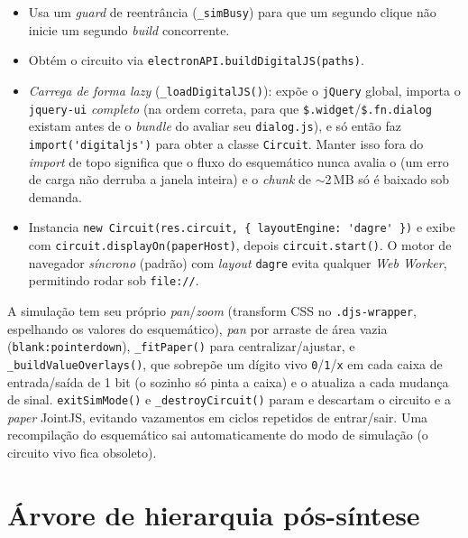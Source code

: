 \begin{itemize}[leftmargin=1.4em]
  \item Usa um \emph{guard} de reentrância (\lstinline|_simBusy|) para que um
        segundo clique não inicie um segundo \emph{build} concorrente.
  \item Obtém o circuito via \lstinline|electronAPI.buildDigitalJS(paths)|.
  \item \emph{Carrega  de forma \emph{lazy}}
        (\lstinline|_loadDigitalJS()|): expõe o \lstinline|jQuery| global,
        importa o \lstinline|jquery-ui| \emph{completo} (na ordem correta, para
        que \lstinline|$.widget|/\lstinline|$.fn.dialog| existam antes de o
        \emph{bundle} do  avaliar seu \lstinline|dialog.js|), e
        só então faz \lstinline|import('digitaljs')| para obter a classe
        \lstinline|Circuit|. Manter isso fora do \emph{import} de topo significa
        que o fluxo do esquemático nunca avalia o  (um erro de
        carga não derruba a janela inteira) e o \emph{chunk} de $\sim$2\,MB só é
        baixado sob demanda.
  \item Instancia \lstinline|new Circuit(res.circuit, { layoutEngine: 'dagre' })|
        e exibe com \lstinline|circuit.displayOn(paperHost)|, depois
        \lstinline|circuit.start()|. O motor de navegador \emph{síncrono} (padrão)
        com \emph{layout} \lstinline|dagre| evita qualquer \emph{Web Worker},
        permitindo rodar sob \lstinline|file://|.
\end{itemize}

A simulação tem seu próprio \emph{pan}/\emph{zoom} (transform CSS no
\lstinline|.djs-wrapper|, espelhando os valores do esquemático), \emph{pan} por
arraste de área vazia (\lstinline|blank:pointerdown|), \lstinline|_fitPaper()|
para centralizar/ajustar, e \lstinline|_buildValueOverlays()|, que sobrepõe um
dígito vivo \lstinline|0|/\lstinline|1|/\lstinline|x| em cada caixa de
entrada/saída de 1 bit (o  sozinho só pinta a caixa) e o atualiza
a cada mudança de sinal. \lstinline|exitSimMode()| e \lstinline|_destroyCircuit()|
param e descartam o circuito e a \emph{paper} JointJS, evitando vazamentos em
ciclos repetidos de entrar/sair. Uma recompilação do esquemático sai
automaticamente do modo de simulação (o circuito vivo fica obsoleto).

\section{Árvore de hierarquia pós-síntese}

